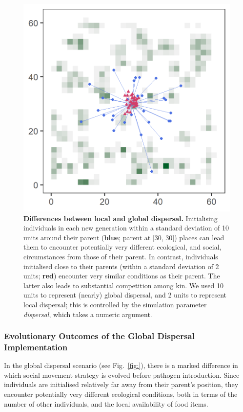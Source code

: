 \begin{figure}
    \centering
    \includegraphics{figures/pathomove/fig_global_dispersal.png}
    \caption{
        \textbf{Differences between local and global dispersal.} 
        Initialising individuals in each new generation within a standard deviation of 10 units around their parent (\textbf{blue}; parent at [30, 30]) places can lead them to encounter potentially very different ecological, and social, circumstances from those of their parent. 
        In contrast, individuals initialised close to their parents (within a standard deviation of 2 units; \textbf{red}) encounter very similar conditions as their parent. 
        The latter also leads to substantial competition among kin. 
        We used 10 units to represent (nearly) global dispersal, and 2 units to represent local dispersal; this is controlled by the simulation parameter \emph{dispersal}, which takes a numeric argument.
    }\label{fig:patho_dispersal}
\end{figure}

\subsubsection*{Evolutionary Outcomes of the Global Dispersal Implementation}

In the global dispersal scenario (see Fig.~\ref{fig:}), there is a marked difference in which social movement strategy is evolved before pathogen introduction.
Since individuals are initialised relatively far away from their parent's position, they encounter potentially very different ecological conditions, both in terms of the number of other individuals, and the local availability of food items.

